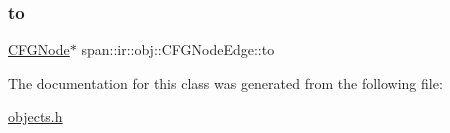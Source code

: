 \subsubsection{\texorpdfstring{to}{to}}
{\footnotesize\ttfamily \hyperlink{classspan_1_1ir_1_1obj_1_1CFGNode}{C\+F\+G\+Node}$\ast$ span\+::ir\+::obj\+::\+C\+F\+G\+Node\+Edge\+::to\hspace{0.3cm}{\ttfamily [private]}}



The documentation for this class was generated from the following file\+:\begin{DoxyCompactItemize}
\item 
\hyperlink{objects_8h}{objects.\+h}\end{DoxyCompactItemize}
